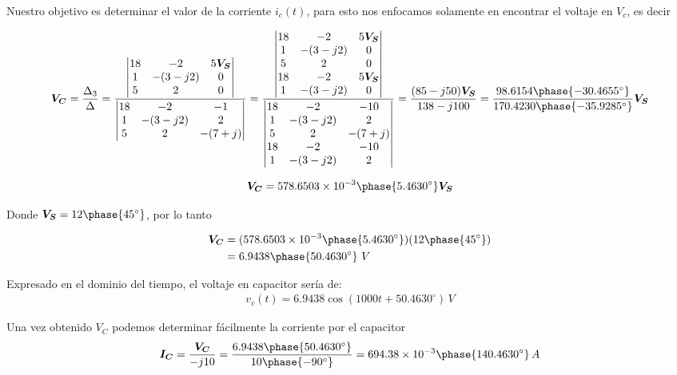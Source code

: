 \documentclass{article}
\begin{document}
	\noindent Nuestro objetivo es determinar el valor de la corriente $i_c(t)$, para esto nos enfocamos solamente en encontrar el voltaje en $V_c$, es decir
	
	\[
	\bm{V_C} = \frac{\Delta_3}{\Delta} =  \frac{\begin{vmatrix}
			18 & -2 & 5\bm{V_S} \\
			1 & -(3-j2) & 0 \\
			5 & 2  & 0
	\end{vmatrix}}{\begin{vmatrix}
	18 & -2 & -1 \\
	1 & -(3-j2) & 2 \\
	5 & 2  &-(7+j)
\end{vmatrix}} =  \frac{\begin{vmatrix}
18 & -2 & 5\bm{V_S} \\
1 & -(3-j2) & 0 \\
5 & 2  & 0\\
18 & -2 & 5\bm{V_S} \\
1 & -(3-j2) & 0
\end{vmatrix}}{\begin{vmatrix}
18 & -2 & -10 \\
1 & -(3-j2) & 2 \\
5 & 2  &-(7+j)\\
18 & -2 & -10 \\
1 & -(3-j2) & 2
\end{vmatrix}} = \frac{(85-j50)\bm{V_S}}{138-j100} = \frac{98.6154\phase{-30.4655^{\circ}}}{170.4230\phase{-35.9285^{\circ}}} \bm{V_S}
	\]
	
\begin{align}
	\bm{V_C} = 578.6503\times 10^{-3}\phase{5.4630^{\circ}}\bm{V_S}\nonumber
\end{align}

\noindent Donde $\bm{V_S} = 12\phase{45^{\circ}}$, por lo tanto

\begin{align}
	\bm{V_C} &= (578.6503\times 10^{-3}\phase{5.4630^{\circ}})(12\phase{45^{\circ}})\nonumber\\
	&= 6.9438\phase{50.4630^{\circ}} \,\, V\nonumber
\end{align}

\noindent Expresado en el dominio del tiempo, el voltaje en capacitor sería de:
\begin{align}
	v_c(t) = 6.9438\cos (1000t + 50.4630^{\circ}) \, V\nonumber
\end{align}

\noindent Una vez obtenido $V_C$ podemos determinar fácilmente la corriente por el capacitor
\begin{align}
	\bm{I_C} = \frac{\bm{V_C}}{-j10} =  \frac{6.9438\phase{50.4630^{\circ}}}{10\phase{-90	^{\circ}}} = 694.38 \times 10^{-3}\phase{140.4630^{\circ}} \,A \nonumber
\end{align}
\end{document}
